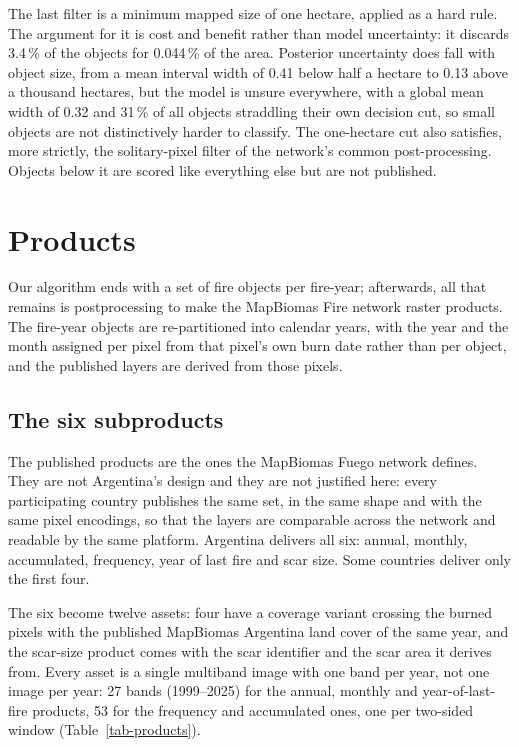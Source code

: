 \documentclass[11pt,a4paper]{article}
\begin{document}
The last filter is a minimum mapped size of one hectare, applied as a hard rule. The argument for
it is cost and benefit rather than model uncertainty: it discards 3.4\,\% of the objects for
0.044\,\% of the area. Posterior uncertainty does fall with object size, from a mean interval
width of 0.41 below half a hectare to 0.13 above a thousand hectares, but the model is unsure
everywhere, with a global mean width of 0.32 and 31\,\% of all objects straddling their own
decision cut, so small objects are not distinctively harder to classify. The one-hectare cut also
satisfies, more strictly, the solitary-pixel filter of the network's common post-processing.
Objects below it are scored like everything else but are not published.

\section{Products}\label{sec-products}

Our algorithm ends with a set of fire objects per fire-year; afterwards,
all that remains is postprocessing to make the MapBiomas Fire network raster products.
The fire-year objects are
re-partitioned into calendar years, with the year and the month assigned per pixel from that
pixel's own burn date rather than per object, and the published layers are derived from those
pixels. 

\subsection{The six subproducts}

The published products are the ones the MapBiomas Fuego network defines. They are not Argentina's
design and they are not justified here: every participating country publishes the same set, in the
same shape and with the same pixel encodings, so that the layers are comparable across the network
and readable by the same platform. Argentina delivers all six: annual, monthly, accumulated,
frequency, year of last fire and scar size. Some countries deliver only the first four.

The six become twelve assets: four have a coverage variant crossing the burned pixels with the
published MapBiomas Argentina land cover of the same year, and the scar-size product comes with
the scar identifier and the scar area it derives from. Every asset is a single multiband image
with one band per year, not one image per year: 27 bands (1999--2025) for the annual, monthly and
year-of-last-fire products, 53 for the frequency and accumulated ones, one per two-sided window
(Table~\ref{tab-products}).
\end{document}
